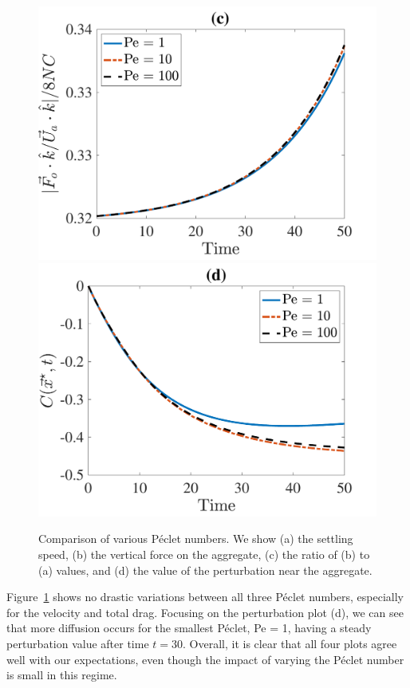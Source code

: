 \begin{figure}[ht]
\begin{center}
		\includegraphics[scale=0.35]{./figures/fig_NC50_Pe_Fo3Ua_ratio}
		\includegraphics[scale=0.35]{./figures/fig_NC50_Pe_C_star}
	\caption{Comparison of various Péclet numbers. We show (a) the settling speed, (b) the vertical force on the aggregate, (c) the ratio of (b) to (a) values, and (d) the value of the perturbation near the aggregate.}
	\label{fig_NC50_Pe}
\end{center}
\end{figure}
\par
Figure~\ref{fig_NC50_Pe} shows no drastic variations between all three Péclet numbers, especially for the velocity and total drag. 
Focusing on the perturbation plot (d), we can see that more diffusion occurs for the smallest Péclet, Pe = 1, having a steady perturbation value after time $t = 30$.
Overall, it is clear that all four plots agree well with our expectations, even though the impact of varying the Péclet number is small in this regime. 
